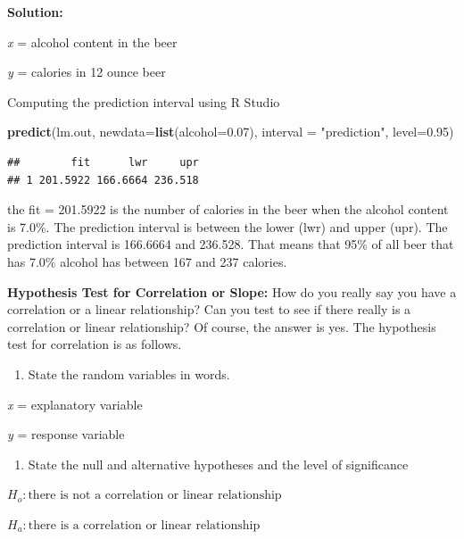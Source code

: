 \documentclass[
]{book}
\newenvironment{Shaded}{\begin{snugshade}}{\end{snugshade}}
\newcommand{\DataTypeTok}[1]{\textcolor[rgb]{0.13,0.29,0.53}{#1}}
\newcommand{\FloatTok}[1]{\textcolor[rgb]{0.00,0.00,0.81}{#1}}
\newcommand{\KeywordTok}[1]{\textcolor[rgb]{0.13,0.29,0.53}{\textbf{#1}}}
\newcommand{\NormalTok}[1]{#1}
\newcommand{\StringTok}[1]{\textcolor[rgb]{0.31,0.60,0.02}{#1}}
\providecommand{\tightlist}{%
  \setlength{\itemsep}{0pt}\setlength{\parskip}{0pt}}
\begin{document}
\textbf{Solution:}

\emph{x} = alcohol content in the beer

\emph{y} = calories in 12 ounce beer

Computing the prediction interval using R Studio

\begin{Shaded}
\begin{Highlighting}[]
\KeywordTok{predict}\NormalTok{(lm.out, }\DataTypeTok{newdata=}\KeywordTok{list}\NormalTok{(}\DataTypeTok{alcohol=}\FloatTok{0.07}\NormalTok{), }\DataTypeTok{interval =} \StringTok{"prediction"}\NormalTok{, }\DataTypeTok{level=}\FloatTok{0.95}\NormalTok{)}
\end{Highlighting}
\end{Shaded}

\begin{verbatim}
##        fit      lwr     upr
## 1 201.5922 166.6664 236.518
\end{verbatim}

the fit = 201.5922 is the number of calories in the beer when the alcohol content is 7.0\%. The prediction interval is between the lower (lwr) and upper (upr). The prediction interval is 166.6664 and 236.528. That means that 95\% of all beer that has 7.0\% alcohol has between 167 and 237 calories.

\textbf{Hypothesis Test for Correlation or Slope:}
How do you really say you have a correlation or a linear relationship? Can you test to see if there really is a correlation or linear relationship? Of course, the answer is yes. The hypothesis test for correlation is as follows.

\begin{enumerate}
\def\labelenumi{\arabic{enumi}.}
\tightlist
\item
  State the random variables in words.
\end{enumerate}

\emph{x} = explanatory variable

\emph{y} = response variable

\begin{enumerate}
\def\labelenumi{\arabic{enumi}.}
\setcounter{enumi}{1}
\tightlist
\item
  State the null and alternative hypotheses and the level of significance
\end{enumerate}

\(H_o: \text{there is not a correlation or linear relationship}\)

\(H_a: \text{there is a correlation or linear relationship}\)
\end{document}
